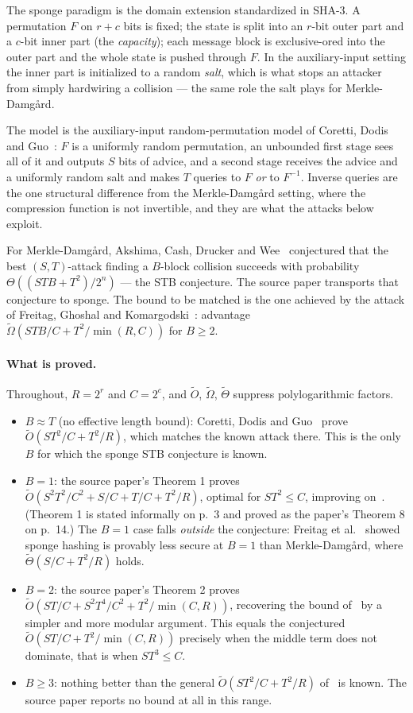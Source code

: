 \documentclass{conjura-conjecture}
\newcommand{\tO}{\tilde{O}}
\newcommand{\tOm}{\tilde{\Omega}}
\newcommand{\tTh}{\tilde{\Theta}}
\begin{document}
The sponge paradigm is the domain extension standardized in SHA-3. A
permutation $F$ on $r + c$ bits is fixed; the state is split into an
$r$-bit outer part and a $c$-bit inner part (the \emph{capacity}); each
message block is exclusive-ored into the outer part and the whole state
is pushed through $F$. In the auxiliary-input setting the inner part is
initialized to a random \emph{salt}, which is what stops an attacker
from simply hardwiring a collision --- the same role the salt plays for
Merkle-Damg\aa{}rd.

The model is the auxiliary-input random-permutation model of Coretti,
Dodis and Guo~\cite{CDG18}: $F$ is a uniformly random permutation, an
unbounded first stage sees all of it and outputs $S$ bits of advice, and
a second stage receives the advice and a uniformly random salt and makes
$T$ queries to $F$ \emph{or} to $F^{-1}$. Inverse queries are the one
structural difference from the Merkle-Damg\aa{}rd setting, where the
compression function is not invertible, and they are what the attacks
below exploit.

For Merkle-Damg\aa{}rd, Akshima, Cash, Drucker and Wee~\cite{ACDW20}
conjectured that the best $(S,T)$-attack finding a $B$-block collision
succeeds with probability $\Theta((STB + T^{2})/2^{n})$ --- the STB
conjecture. The source paper transports that conjecture to sponge. The
bound to be matched is the one achieved by the attack of Freitag,
Ghoshal and Komargodski~\cite{FGK22}: advantage $\tOm(STB/C +
T^{2}/\min(R,C))$ for $B \ge 2$.

\paragraph{What is proved.}
Throughout, $R = 2^{r}$ and $C = 2^{c}$, and $\tO$, $\tOm$, $\tTh$
suppress polylogarithmic factors.

\begin{itemize}
\item $B \approx T$ (no effective length bound): Coretti, Dodis and
  Guo~\cite{CDG18} prove $\tO(ST^{2}/C + T^{2}/R)$, which matches the
  known attack there. This is the only $B$ for which the sponge STB
  conjecture is known.
\item $B = 1$: the source paper's Theorem 1 proves
  $\tO(S^{2}T^{2}/C^{2} + S/C + T/C + T^{2}/R)$, optimal for
  $ST^{2} \le C$, improving on~\cite{FGK22}. (Theorem 1 is stated
  informally on p.~3 and proved as the paper's Theorem 8 on p.~14.) The $B = 1$ case falls
  \emph{outside} the conjecture: Freitag et al.~\cite{FGK22} showed
  sponge hashing is
  provably less secure at $B = 1$ than Merkle-Damg\aa{}rd, where
  $\tTh(S/C + T^{2}/R)$ holds.
\item $B = 2$: the source paper's Theorem 2 proves
  $\tO(ST/C + S^{2}T^{4}/C^{2} + T^{2}/\min(C,R))$, recovering the
  bound of~\cite{FGK22} by a simpler and more modular argument. This
  equals the conjectured $\tO(ST/C + T^{2}/\min(C,R))$ precisely when
  the middle term does not dominate, that is when $ST^{3} \le C$.
\item $B \ge 3$: nothing better than the general $\tO(ST^{2}/C +
  T^{2}/R)$ of~\cite{CDG18} is known. The source paper reports no
  bound at all in this range.
\end{itemize}
\end{document}
